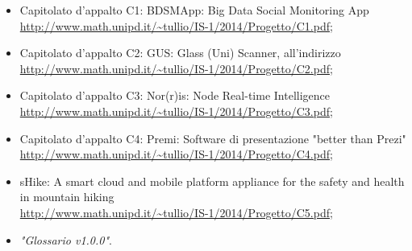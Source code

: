 \begin{itemize}
    \item Capitolato d’appalto C1: BDSMApp: Big Data Social Monitoring App \\ \url{http://www.math.unipd.it/~tullio/IS-1/2014/Progetto/C1.pdf};
    \item Capitolato d’appalto C2: GUS: Glass (Uni) Scanner, all’indirizzo \\ \url{http://www.math.unipd.it/~tullio/IS-1/2014/Progetto/C2.pdf};
    \item Capitolato d’appalto C3: Nor(r)is: Node Real-time Intelligence \\ \url{http://www.math.unipd.it/~tullio/IS-1/2014/Progetto/C3.pdf};
    \item Capitolato d’appalto C4: Premi: Software di presentazione "better than Prezi" \\ \url{http://www.math.unipd.it/~tullio/IS-1/2014/Progetto/C4.pdf};
    \item sHike: A smart cloud and mobile platform appliance for the safety and health in mountain hiking \\ \url{http://www.math.unipd.it/~tullio/IS-1/2014/Progetto/C5.pdf};
    \item \textit{"Glossario v1.0.0"}.
 
 
 

\end{itemize}
